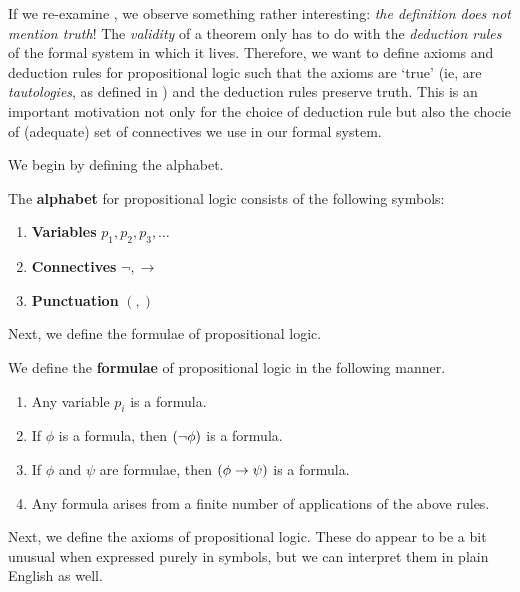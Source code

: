 If we re-examine , we observe something rather interesting: \textit{the definition does not mention truth}! The \textit{validity} of a theorem only has to do with the \textit{deduction rules} of the formal system in which it lives. Therefore, we want to define axioms and deduction rules for propositional logic such that the axioms are `true' (ie, are \textit{tautologies}, as defined in ) and the deduction rules preserve truth. This is an important motivation not only for the choice of deduction rule but also the chocie of (adequate) set of connectives we use in our formal system.

We begin by defining the alphabet.

\begin{boxdefinition}\label{Ch1:Def:FormalPropAlphabet}
    The \textbf{alphabet} for propositional logic consists of the following symbols:
    \begin{enumerate}
        \item \textbf{Variables} $p_1, p_2, p_3, \ldots$
        \item \textbf{Connectives} $\neg, \to$
        \item \textbf{Punctuation} $(, )$
    \end{enumerate}
\end{boxdefinition}

Next, we define the formulae of propositional logic.

\begin{boxdefinition}\label{Ch1:Def:FormalPropFormulae}
    We define the \textbf{formulae} of propositional logic in the following manner.
    \begin{enumerate}
        \item Any variable $p_i$ is a formula.
        \item If $\phi$ is a formula, then $\left( \neg \phi \right)$ is a formula.
        \item If $\phi$ and $\psi$ are formulae, then $\left( \phi \to \psi \right)$ is a formula.
        \item Any formula arises from a finite number of applications of the above rules.
    \end{enumerate}
\end{boxdefinition}

Next, we define the axioms of propositional logic. These do appear to be a bit unusual when expressed purely in symbols, but we can interpret them in plain English as well.


